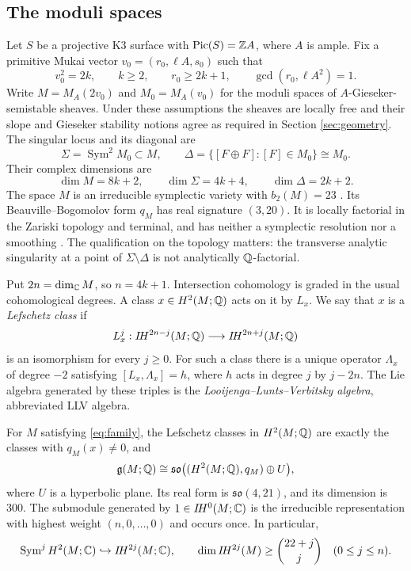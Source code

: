 \subsection{The moduli spaces}
Let $S$ be a projective K3 surface with $\operatorname{Pic}(S)=\mathbb Z A$,
where $A$ is ample. Fix a primitive Mukai vector
$v_0=(r_0,\ell A,s_0)$ such that
\begin{equation}\label{eq:family}
 v_0^2=2k,\qquad k\ge2,\qquad r_0\ge2k+1,
 \qquad \gcd(r_0,\ell A^2)=1.
\end{equation}
Write $M=M_A(2v_0)$ and $M_0=M_A(v_0)$ for the moduli spaces of
$A$-Gieseker-semistable sheaves. Under these assumptions the sheaves
are locally free and their slope and Gieseker stability notions
agree as required in Section \ref{sec:geometry}. The singular locus
and its diagonal are
\[
 \Sigma=\operatorname{Sym}^2M_0\subset M,
 \qquad \Delta=\{[F\oplus F]:[F]\in M_0\}\cong M_0.
\]
Their complex dimensions are
\[
 \dim M=8k+2,\qquad \dim\Sigma=4k+4,\qquad \dim\Delta=2k+2.
\]
The space $M$ is an irreducible symplectic variety with $b_2(M)=23$
\cite{pr20,pr23}. Its Beauville--Bogomolov form $q_M$ has real
signature $(3,20)$. It is locally factorial in the Zariski topology
and terminal, and has neither a symplectic resolution nor a smoothing
\cite{kls06,namikawa01,namikawa06}. The qualification on the topology
matters: the transverse analytic singularity at a point of
$\Sigma\setminus\Delta$ is not analytically $\mathbb Q$-factorial.

Put $2n=\dim_{\mathbb C}M$, so $n=4k+1$. Intersection cohomology is graded
in the usual cohomological degrees. A class $x\in H^2(M;\mathbb Q)$ acts
on it by $L_x$. We say that $x$ is a \emph{Lefschetz class} if
\[
 L_x^j:I\!H^{2n-j}(M;\mathbb Q)\longrightarrow I\!H^{2n+j}(M;\mathbb Q)
\]
is an isomorphism for every $j\ge0$. For such a class there is a
unique operator $\Lambda_x$ of degree $-2$ satisfying
$[L_x,\Lambda_x]=h$, where $h$ acts in degree $j$ by $j-2n$.
The Lie algebra generated by these triples is the
\emph{Looijenga--Lunts--Verbitsky algebra}, abbreviated LLV algebra.

\begin{theorem}\label{thm:main}
For $M$ satisfying \eqref{eq:family}, the Lefschetz classes in
$H^2(M;\mathbb Q)$ are exactly the classes with $q_M(x)\ne0$, and
\[
 \mathfrak g(M;\mathbb Q)\cong
 \mathfrak{so}\big((H^2(M;\mathbb Q),q_M)\oplus U\big),
\]
where $U$ is a hyperbolic plane. Its real form is
$\mathfrak{so}(4,21)$, and its dimension is $300$.
The submodule generated by $1\in I\!H^0(M;\mathbb C)$ is the irreducible
representation with highest weight $(n,0,\ldots,0)$ and occurs once.
In particular,
\[
 \operatorname{Sym}^jH^2(M;\mathbb C)\hookrightarrow I\!H^{2j}(M;\mathbb C),
 \qquad \dim I\!H^{2j}(M)\ge\binom{22+j}{j}\quad(0\le j\le n).
\]
\end{theorem}

